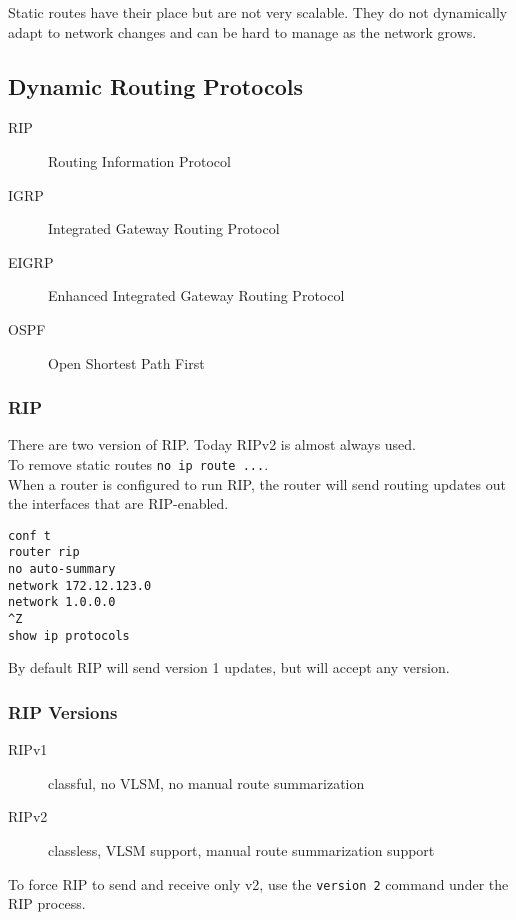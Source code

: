 Static routes have their place but are not very scalable. They do not
dynamically adapt to network changes and can be hard to manage as the network
grows.

\subsection{Dynamic Routing Protocols}

\begin{description}
\item[RIP]
Routing Information Protocol
\item[IGRP]
Integrated Gateway Routing Protocol
\item[EIGRP]
Enhanced Integrated Gateway Routing Protocol
\item[OSPF]
Open Shortest Path First
\end{description}

\subsubsection{RIP}

There are two version of RIP. Today RIPv2 is almost always used.\\

To remove static routes \texttt{no ip route ...}.\\

When a router is configured to run RIP, the router will send routing updates
out the interfaces that are RIP-enabled.

\begin{verbatim}
conf t
router rip
no auto-summary
network 172.12.123.0
network 1.0.0.0
^Z
show ip protocols
\end{verbatim}

By default RIP will send version 1 updates, but will accept any version.

\subsubsection{RIP Versions}

\begin{description}
\item[RIPv1]
classful, no VLSM, no manual route summarization
\item[RIPv2]
classless, VLSM support, manual route summarization support
\end{description}

To force RIP to send and receive only v2, use the \texttt{version 2}
command under the RIP process.

